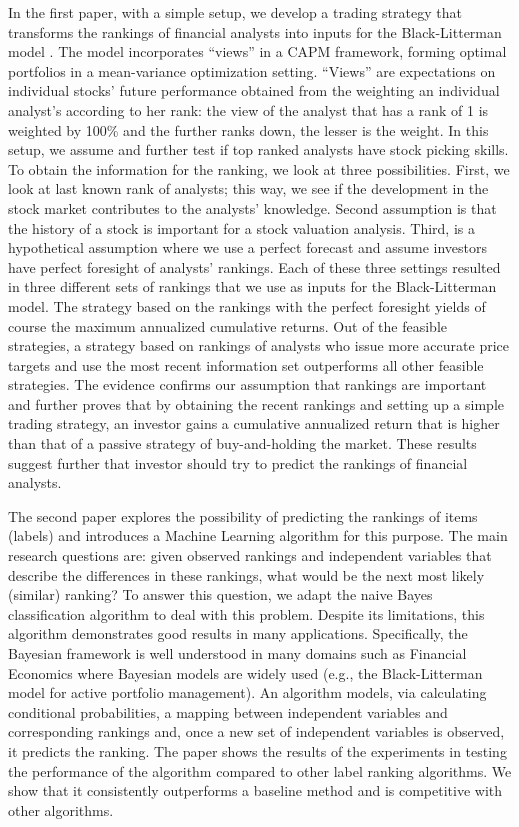 In the first paper, with a simple setup, we develop a trading strategy that transforms the rankings of financial analysts into inputs for the Black-Litterman model \cite{black1992}. The model incorporates “views'' in a CAPM framework, forming optimal portfolios in a mean-variance optimization setting. “Views'' are expectations on individual stocks’ future performance obtained from the weighting an individual analyst’s according to her rank: the view of the analyst that has a rank of 1 is weighted by 100\% and the further ranks down, the lesser is the weight. In this setup, we assume and further test if top ranked analysts have stock picking skills. To obtain the information for the ranking, we look at three possibilities. First, we look at last known rank of analysts; this way, we see if the \naive{} development in the stock market contributes to the analysts’ knowledge. Second assumption is that the  history of a stock is important for a stock valuation analysis. Third, is a hypothetical assumption where we use a perfect forecast and assume investors have perfect foresight of analysts' rankings. Each of these three settings resulted in three different sets of rankings that we use as inputs for the Black-Litterman model. The strategy based on the rankings with the perfect foresight yields of course the maximum annualized cumulative returns. Out of the feasible strategies, a strategy based on rankings of analysts who issue more accurate price targets and use the most recent information set outperforms all other feasible strategies. The evidence confirms our assumption that rankings are important and further proves that by obtaining the recent rankings and setting up a simple trading strategy, an investor gains a cumulative annualized return that is higher than that of a passive strategy of buy-and-holding the market. These results suggest further that investor should try to predict the rankings of financial analysts.

The second paper explores the possibility of predicting the rankings of items (labels) and introduces a Machine Learning algorithm for this purpose. The main research questions are: given observed rankings and independent variables that describe the differences in these rankings, what would be the next most likely (similar) ranking? To answer this question, we adapt the naive Bayes classification algorithm to deal with this problem. Despite its limitations, this algorithm demonstrates good results in many applications. Specifically, the Bayesian framework is well understood in many domains such as Financial Economics where Bayesian models are widely used (e.g., the Black-Litterman model for active portfolio management). An algorithm models, via calculating conditional probabilities, a mapping between independent variables and corresponding rankings and, once a new set of independent variables is observed, it predicts the ranking. The paper shows the results of the experiments in testing the performance of the algorithm compared to other label ranking algorithms. We show that it consistently outperforms a baseline method and is competitive with other algorithms.


